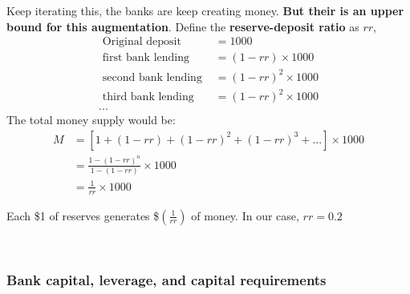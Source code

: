 \documentclass[12pt]{article}
\begin{document}
Keep iterating this, the banks are keep creating money. {\textbf {But their is an
upper bound for this augmentation}}. Define the {\textbf {reserve-deposit ratio}} as 
$ rr $,
\begin{align*}
\text{ Original deposit } &= 1000\\
\text{ first bank lending }  &= (1 - rr) \times 1000\\
\text{ second bank lending }  &= (1 - rr)^{2} \times 1000\\
\text{ third bank lending }  &= (1 - rr)^{2} \times 1000\\
...
\end{align*}
The total money supply would be:
\begin{align*}
M &= \left[ 1 + (1 - rr) + (1 - rr)^{2} + (1 - rr)^{3} + ... \right]  \times 1000\\
	&= \frac{1 - (1 - rr)^{n}}{1 - (1 - rr)}  \times 1000\\
	&= \frac{1}{rr} \times 1000
\end{align*}

Each \$1 of reserves generates \$$ (\frac{1}{rr}) $ of money. In our case, $ rr = 0.2 $



\noindent{}\\



\subsubsection{Bank capital, leverage, and capital requirements}



\begin{figure}[H]
\end{figure}
\end{document}
